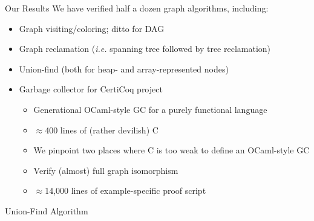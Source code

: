\documentclass[professionalfonts, xcolor=table]{beamer}
\begin{document}
\begin{frame}{Our Results}
We have verified half a dozen graph algorithms, including:
\begin{itemize}
\item Graph visiting/coloring; ditto for DAG
\item Graph reclamation (\emph{i.e.} spanning tree followed by tree reclamation)
\item Union-find (both for heap- and array-represented nodes)
\item Garbage collector for CertiCoq project
\begin{itemize}
\item Generational OCaml-style GC for a purely functional language
\item $\approx$400 lines of (rather devilish) C
\item We pinpoint two places where C is too weak to define an OCaml-style GC
\item Verify (almost) full graph isomorphism
\item $\approx$14,000 lines of example-specific proof script
\end{itemize}
\end{itemize}
\end{frame}

\begin{frame}{Union-Find Algorithm}
  \centering
\end{frame}
\end{document}
